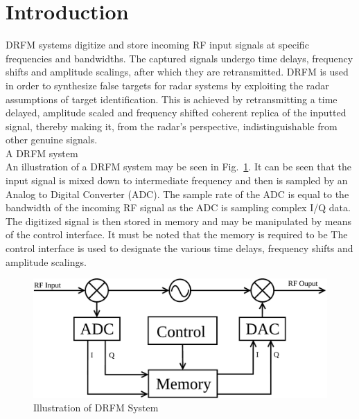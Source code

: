 \section{Introduction}
	\noindent DRFM systems digitize and store incoming RF input signals at specific frequencies and bandwidths. The captured signals undergo time delays, frequency shifts and amplitude scalings, after which they are retransmitted. DRFM is used in order to synthesize false targets for radar systems by exploiting the radar assumptions of target identification. This is achieved by retransmitting a time delayed, amplitude scaled and frequency shifted coherent replica of the inputted signal, thereby making it, from the radar's perspective, indistinguishable from other genuine signals\cite{SJROOME}.\\  A DRFM system 	\\ \newline An illustration of a DRFM system may be seen in Fig.~\ref{fig:DRFM_Intro}. It can be seen that the input signal is mixed down to intermediate frequency and then is sampled by an Analog to Digital Converter (ADC). The sample rate of the ADC is equal to the bandwidth of the incoming RF signal as the ADC is sampling complex I/Q data. The digitized signal is then stored in memory and may be manipulated by means of the control interface. It must be noted that the memory is required to be The control interface is used to designate the various time delays, frequency shifts and amplitude scalings. 

	\begin{figure}[h!]
		\centering
		\includegraphics[width=0.8\linewidth]{img/DRFM_Intro}
		\caption{Illustration of DRFM System}
		\label{fig:DRFM_Intro}
	\end{figure}
		



